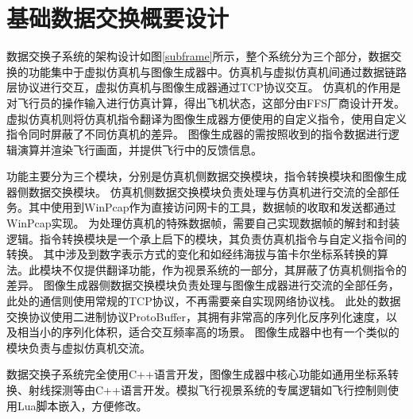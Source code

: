 \section{基础数据交换概要设计}
数据交换子系统的架构设计如图\ref{subframe}所示，整个系统分为三个部分，数据交换的功能集中于虚拟仿真机与图像生成器中。仿真机与虚拟仿真机间通过数据链路层协议进行交互，虚拟仿真机与图像生成器通过TCP协议交互。
仿真机的作用是对飞行员的操作输入进行仿真计算，得出飞机状态，这部分由FFS厂商设计开发。虚拟仿真机则将仿真机指令翻译为图像生成器方便使用的自定义指令，使用自定义指令同时屏蔽了不同仿真机的差异。
图像生成器的需按照收到的指令数据进行逻辑演算并渲染飞行画面，并提供飞行中的反馈信息。
\par
功能主要分为三个模块，分别是仿真机侧数据交换模块，指令转换模块和图像生成器侧数据交换模块。
仿真机侧数据交换模块负责处理与仿真机进行交流的全部任务。其中使用到WinPcap作为直接访问网卡的工具，数据帧的收取和发送都通过WinPcap实现。
为处理仿真机的特殊数据帧，需要自己实现数据帧的解封和封装逻辑。指令转换模块是一个承上启下的模块，其负责仿真机指令与自定义指令间的转换。
其中涉及到数字表示方式的变化和如经纬海拔与笛卡尔坐标系转换的算法。此模块不仅提供翻译功能，作为视景系统的一部分，其屏蔽了仿真机侧指令的差异。
图像生成器侧数据交换模块负责处理与图像生成器进行交流的全部任务，此处的通信则使用常规的TCP协议，不再需要亲自实现网络协议栈。
此处的数据交换协议使用二进制协议ProtoBuffer，其拥有非常高的序列化反序列化速度，以及相当小的序列化体积，适合交互频率高的场景。
图像生成器中也有一个类似的模块负责与虚拟仿真机交流。
\par 
数据交换子系统完全使用C++语言开发，图像生成器中核心功能如通用坐标系转换、射线探测等由C++语言开发。模拟飞行视景系统的专属逻辑如飞行控制则使用Lua脚本嵌入，方便修改。


